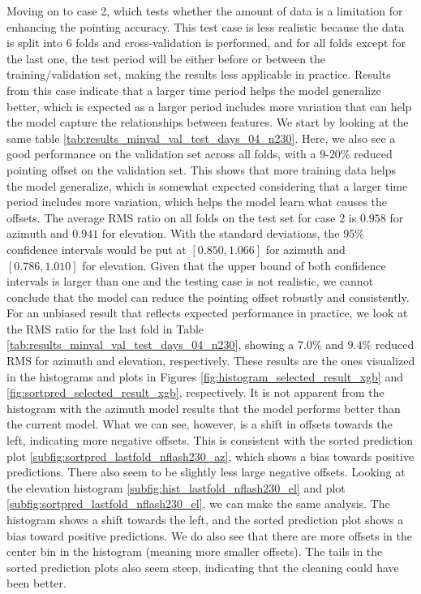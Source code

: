 Moving on to case 2, which tests whether the amount of data is a limitation for enhancing the pointing accuracy.
This test case is less realistic because the data is split into $6$ folds and cross-validation is performed,
and for all folds except for the last one, the test period will be either before or between the training/validation set, making the results less applicable in practice.
Results from this case indicate that a larger time period helps the model generalize better, which is expected as a larger period includes more variation that can help the model capture the relationships between features.
We start by looking at the same table \ref{tab:results_minval_val_test_days_04_n230}.
Here, we also see a good performance on the validation set across all folds, with a $9$-$20\%$ reduced pointing offset on the validation set.
This shows that more training data helps the model generalize, which is somewhat expected considering that a larger time period includes more variation,
which helps the model learn what causes the offsets.
The average RMS ratio on all folds on the test set for case 2 is $0.958$ for azimuth and $0.941$ for elevation.
With the standard deviations, the $95\%$ confidence intervals would be put at $[0.850, 1.066]$ for azimuth and $[0.786, 1.010]$ for elevation.
Given that the upper bound of both confidence intervals is larger than one and the testing case is not realistic, we cannot conclude that the model can reduce the pointing offset robustly and consistently.
For an unbiased result that reflects expected performance in practice, we look at the RMS ratio for the last fold in Table \ref{tab:results_minval_val_test_days_04_n230},
showing a $7.0\%$ and $9.4\%$ reduced RMS for azimuth and elevation, respectively.
These results are the ones visualized in the histograms and plots in Figures \ref{fig:histogram_selected_result_xgb} and \ref{fig:sortpred_selected_result_xgb}, respectively.
It is not apparent from the histogram with the azimuth model results that the model performs better than the current model.
What we can see, however, is a shift in offsets towards the left, indicating more negative offsets.
This is consistent with the sorted prediction plot \ref{subfig:sortpred_lastfold_nflash230_az}, which shows a bias towards positive predictions.
There also seem to be slightly less large negative offsets.
Looking at the elevation histogram \ref{subfig:hist_lastfold_nflash230_el} and plot \ref{subfig:sortpred_lastfold_nflash230_el}, we can make the same analysis.
The histogram shows a shift towards the left, and the sorted prediction plot shows a bias toward positive predictions.
We do also see that there are more offsets in the center bin in the histogram (meaning more smaller offsets).
The tails in the sorted prediction plots also seem steep, indicating that the cleaning could have been better.\\


